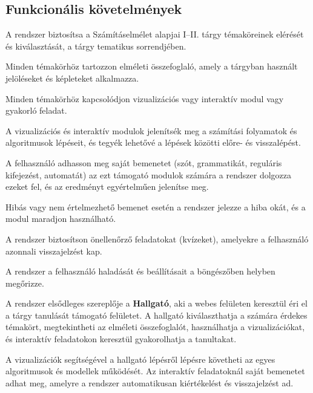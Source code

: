 \subsection{Funkcionális követelmények}
\begin{compactdesc}
    \item[FK-1] A rendszer biztosítsa a Számításelmélet alapjai I--II.
          tárgy témaköreinek elérését és kiválasztását, a tárgy
          tematikus sorrendjében.
    \item[FK-2] Minden témakörhöz tartozzon elméleti összefoglaló, amely
          a tárgyban használt jelöléseket és képleteket alkalmazza.
    \item[FK-3] Minden témakörhöz kapcsolódjon vizualizációs vagy
          interaktív modul vagy gyakorló feladat.
    \item[FK-4] A vizualizációs és interaktív modulok jelenítsék meg a
          számítási folyamatok és algoritmusok lépéseit, és tegyék
          lehetővé a lépések közötti előre- és visszalépést.
    \item[FK-5] A felhasználó adhasson meg saját bemenetet (szót,
          grammatikát, reguláris kifejezést, automatát) az ezt támogató
          modulok számára a rendszer dolgozza ezeket fel, és az eredményt
          egyértelműen jelenítse meg.
    \item[FK-6] Hibás vagy nem értelmezhető bemenet esetén a rendszer
          jelezze a hiba okát, és a modul maradjon használható.
    \item[FK-7] A rendszer biztosítson önellenőrző feladatokat (kvízeket),
          amelyekre a felhasználó azonnali visszajelzést kap.
    \item[FK-8] A rendszer a felhasználó haladását és beállításait a
          böngészőben helyben megőrizze.
\end{compactdesc}


A rendszer elsődleges szereplője a \textbf{Hallgató}, aki a webes
felületen keresztül éri el a tárgy tanulását támogató felületet. A
hallgató kiválaszthatja a számára érdekes témakört, megtekintheti az
elméleti összefoglalót, használhatja a vizualizációkat, és interaktív
feladatokon keresztül gyakorolhatja a tanultakat.

A vizualizációk segítségével a hallgató lépésről lépésre követheti az
egyes algoritmusok és modellek működését. Az interaktív feladatoknál
saját bemenetet adhat meg, amelyre a rendszer automatikusan
kiértékelést és visszajelzést ad.

